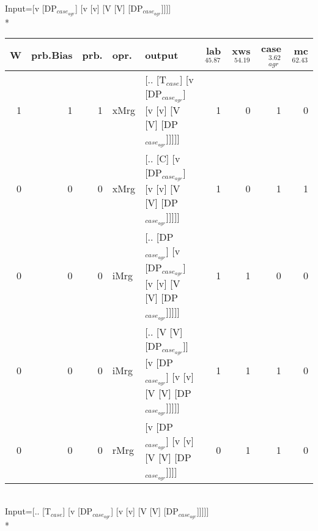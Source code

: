 \begingroup\scriptsize Input=[v [DP$_{case_{agr}}$] [v [v] [V [V] [DP$_{case_{agr}}$]]]]\\*
\begin{tabularx}{\linewidth}{rrrlXrrrr}
\hline
   W &   prb.Bias &   prb. & opr.   & output                                                                     &   lab$^{45.87}$ &   xws$^{54.19}$ &   case$_{agr}^{3.62}$ &   mc$^{62.43}$ \\
\hline
   1 &       1 &   1 & xMrg & [.. [T$_{case}$] [v [DP$_{case_{agr}}$] [v [v] [V [V] [DP$_{case_{agr}}$]]]]]              &             1 &             0 &                  1 &            0 \\
   0 &       0 &   0 & xMrg & [.. [C] [v [DP$_{case_{agr}}$] [v [v] [V [V] [DP$_{case_{agr}}$]]]]]                   &             1 &             0 &                  1 &            1 \\
   0 &       0 &   0 & iMrg & [.. [DP$_{case_{agr}}$] [v [DP$_{case_{agr}}$] [v [v] [V [V] [DP$_{case_{agr}}$]]]]]         &             1 &             1 &                  0 &            0 \\
   0 &       0 &   0 & iMrg & [.. [V [V] [DP$_{case_{agr}}$]] [v [DP$_{case_{agr}}$] [v [v] [V [V] [DP$_{case_{agr}}$]]]]] &             1 &             1 &                  1 &            0 \\
   0 &       0 &   0 & rMrg & [v [DP$_{case_{agr}}$] [v [v] [V [V] [DP$_{case_{agr}}$]]]]                            &             0 &             1 &                  1 &            0 \\
\hline
\end{tabularx}\endgroup\\
\begingroup\scriptsize Input=[.. [T$_{case}$] [v [DP$_{case_{agr}}$] [v [v] [V [V] [DP$_{case_{agr}}$]]]]]\\*
